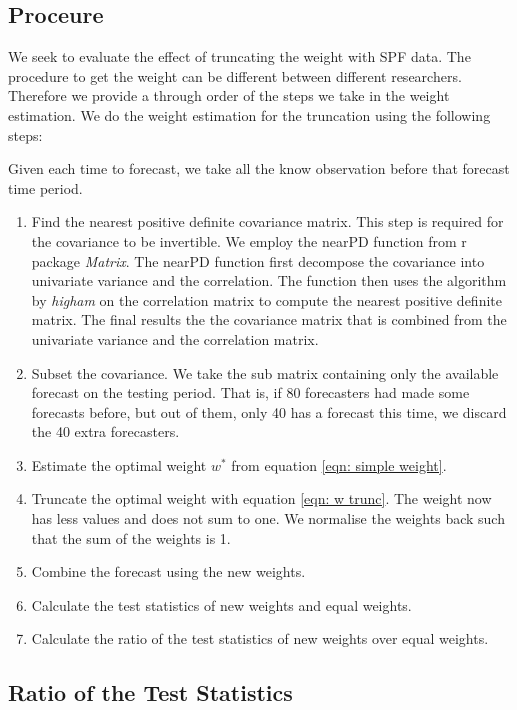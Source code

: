 \documentclass[11pt]{article}
\begin{document}
\subsection{Proceure}\label{proceure}

We seek to evaluate the effect of truncating the weight with SPF data.
The procedure to get the weight can be different between different
researchers. Therefore we provide a through order of the steps we take in
the weight estimation. We do the weight estimation for the truncation
using the following steps:

Given each time to forecast, we take all the know observation before
that forecast time period.

\begin{enumerate}
	\def\labelenumi{\arabic{enumi}.}
	\item
	Find the nearest positive definite covariance matrix. This step is
	required for the covariance to be invertible. We employ the nearPD
	function from r package \emph{Matrix}. The nearPD function first
	decompose the covariance into univariate variance and the correlation.
	The function then uses the algorithm by \emph{higham} on the
	correlation matrix to compute the nearest positive definite matrix.
	The final results the the covariance matrix that is combined from the
	univariate variance and the correlation matrix.
	\item
	Subset the covariance. We take the sub matrix containing only the available forecast on the
	testing period. That is, if 80 forecasters had made some forecasts
	before, but out of them, only 40 has a forecast this time, we discard
	the 40 extra forecasters.
	\item
	Estimate the optimal weight \(w^*\) from equation
	\ref{eqn: simple weight}.
	\item
	Truncate the optimal weight with equation \ref{eqn: w trunc}. The weight now
	has less values and does not sum to one. We normalise the weights back such that the sum of the weights is 1.
	\item
	Combine the forecast using the new weights.
	\item
	Calculate the test statistics of new weights and equal weights.
	\item
	Calculate the ratio of the test statistics of new weights over equal weights.
\end{enumerate}

\subsection{Ratio of the Test Statistics}\label{ratio-of-mean-squared-prediction-error}
\end{document}
